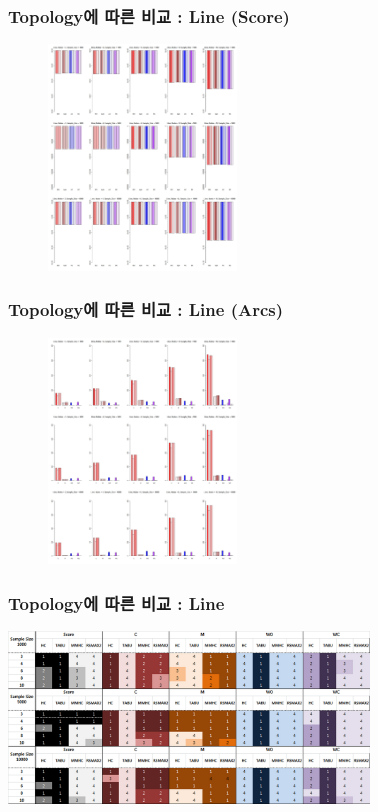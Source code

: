 \documentclass{beamer}
\begin{document}
\begin{frame}
\frametitle{Topology에 따른 비교 : Line (Score)}
{\scriptsize{}
	\begin{figure}
		\includegraphics[height=170pt]{images/02_Line_Score}
	\end{figure}	
}
\end{frame}


\begin{frame}
\frametitle{Topology에 따른 비교 : Line (Arcs)}
{\scriptsize{}
	\begin{figure}
		\includegraphics[height=170pt]{images/02_Line_Arcs}
	\end{figure}	
}
\end{frame}



\begin{frame}
\frametitle{Topology에 따른 비교 : Line}
{\scriptsize{}
	\begin{center}
		\includegraphics[height=130pt]{images/Result_Line}
	\end{center}
}
\end{frame}
\end{document}
